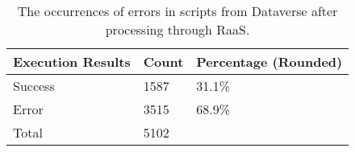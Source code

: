 \begin{table}
\centering
\caption{The occurrences of errors in scripts from Dataverse after processing through RaaS.}
\label{tab:raas-err-occ}
\begin{tabular}{lll}
\toprule
Execution Results & Count & Percentage (Rounded) \\
\midrule
          Success &  1587 &                31.1\% \\ \hline
            Error &  3515 &                68.9\% \\ \hline
            Total &  5102 &                      \\
\bottomrule
\end{tabular}
\end{table}
